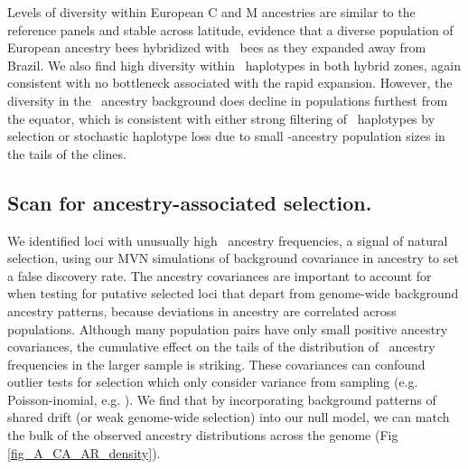 Levels of diversity within European C and M ancestries are similar to the reference panels and stable across latitude, evidence that a diverse population of European ancestry bees hybridized with \scutellata\ bees as they expanded away from Brazil. We also find high diversity within \A\ haplotypes in both hybrid zones, again consistent with no bottleneck associated with the rapid expansion. However, the diversity in the \A\ ancestry background does decline in populations furthest from the equator, which is consistent with either strong filtering of \scutellata\ haplotypes by selection or stochastic haplotype loss due to small \scutellata-ancestry population sizes in the tails of the clines.

\subsection*{Scan for ancestry-associated selection.}
We identified loci with unusually high \A\ ancestry frequencies, a signal of natural selection, using our MVN simulations of background covariance in ancestry to set a false discovery rate. The ancestry covariances are important to account for when testing for putative selected loci that depart from genome-wide background ancestry patterns, because deviations in ancestry are correlated across populations. Although many population pairs have only small positive ancestry covariances, the cumulative effect on the tails of the distribution of \A\ ancestry frequencies in the larger sample is striking. These covariances can confound outlier tests for selection which only consider variance from sampling (e.g. Poisson-inomial, e.g. \cite{Nelson:2017cj}). We find that by incorporating background patterns of shared drift (or weak genome-wide selection) into our null model, we can match the bulk of the observed ancestry distributions across the genome (Fig \ref{fig_A_CA_AR_density}).

